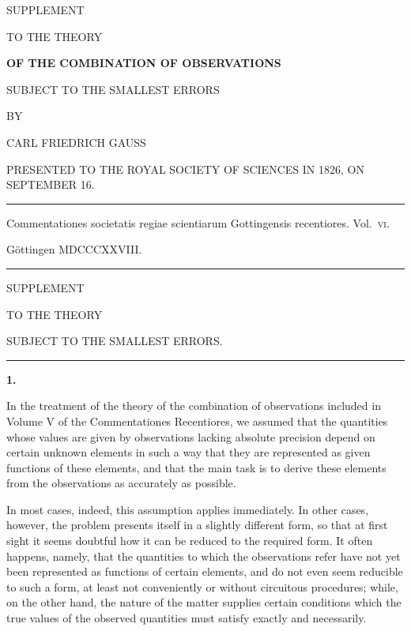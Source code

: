 \clearpage
{}
\thispagestyle{empty}
\begin{center}
\vspace*{2em}
{\Large SUPPLEMENT\par}
\bigskip
{\Large TO THE THEORY\par}
\bigskip
{\Large\bfseries OF THE COMBINATION OF OBSERVATIONS\par}
\bigskip
{\large SUBJECT TO THE SMALLEST ERRORS\par}
\bigskip
BY\par
\bigskip
{\large CARL FRIEDRICH GAUSS\par}
\bigskip
{\small PRESENTED TO THE ROYAL SOCIETY OF SCIENCES IN 1826, ON SEPTEMBER 16.\par}
\bigskip
\rule{.7\linewidth}{.3pt}\par
\bigskip
Commentationes societatis regiae scientiarum Gottingensis recentiores.
\mbox{Vol.~\textsc{vi}.}
\par\medskip
Göttingen MDCCCXXVIII.
\par\bigskip
\rule{.7\linewidth}{.3pt}
\end{center}
\clearpage
\renewcommand{\Article}[1]{\par\medskip\Needspace{4\baselineskip}\pdfbookmark[1]{Art. #1}{supplementum-art-#1}\centerline{\textbf{#1.}}\nobreak\smallskip}
\begin{center}
{\large SUPPLEMENT\par}
\medskip TO THE THEORY\par
{}
\medskip SUBJECT TO THE SMALLEST ERRORS.\par
\medskip\rule{.25\linewidth}{.3pt}
\end{center}
\Article{1}
In the treatment of the theory of the combination of observations included in Volume V of the Commentationes Recentiores, we assumed that the quantities whose values are given by observations lacking absolute precision depend on certain unknown elements in such a way that they are represented as given functions of these elements, and that the main task is to derive these elements from the observations as accurately as possible.

In most cases, indeed, this assumption applies immediately. In other cases, however, the problem presents itself in a slightly different form, so that at first sight it seems doubtful how it can be reduced to the required form. It often happens, namely, that the quantities to which the observations refer have not yet been represented as functions of certain elements, and do not even seem reducible to such a form, at least not conveniently or without circuitous procedures; while, on the other hand, the nature of the matter supplies certain conditions which the true values of the observed quantities must satisfy exactly and necessarily.

